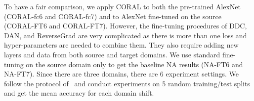\documentclass[letterpaper]{article}
\begin{document}
To have a fair comparison, we apply CORAL to both the pre-trained AlexNet (CORAL-fc6 and CORAL-fc7) and to AlexNet fine-tuned on the source (CORAL-FT6 and CORAL-FT7). However, the fine-tuning procedures of DDC, DAN, and ReverseGrad are very complicated as there is more than one loss and hyper-parameters are needed to combine them. They also require adding new layers and data from both source and target domains. We use standard fine-tuning on the source domain only to get the baseline NA results (NA-FT6 and NA-FT7). Since there are three domains, there are 6 experiment settings. We follow the protocol of~\cite{decaf,tzeng_arxiv15,reversegrad} and conduct experiments on 5 random training/test splits and get the mean accuracy for each domain shift.

\begin{table}[t]
\begin{center}
\end{center}
\end{table}
\end{document}

